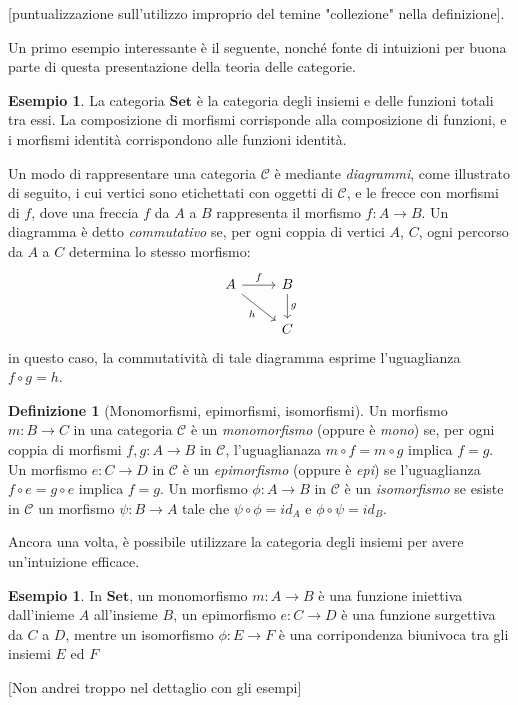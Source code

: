 \documentclass{article}
\theoremstyle{plain}
\theoremstyle{definition}
\newtheorem{definition}[theorem]{Definizione}
\newtheorem{example}[theorem]{Esempio}
\newcommand{\id}[1]{id_{#1}}
\begin{document}
	[puntualizzazione sull'utilizzo improprio del temine "collezione" nella definizione].
	
	Un primo esempio interessante è il seguente, nonché fonte di intuizioni per buona parte di questa presentazione della teoria delle categorie.

	\begin{example}
		La categoria $\textbf{Set}$ è la categoria degli insiemi e delle funzioni totali tra essi. 
		La composizione di morfismi corrisponde alla composizione di funzioni, e i morfismi identità corrispondono alle funzioni identità.
	\end{example}

	Un modo di rappresentare una categoria $\mathcal{C}$ è mediante \emph{diagrammi}, come illustrato di seguito,
	i cui vertici sono etichettati con oggetti di $\mathcal{C}$, e le frecce con morfismi di $f$, dove una 
	freccia $f$ da $A$ a $B$ rappresenta il morfismo $f: A \rightarrow B$. 
	Un diagramma è detto \emph{commutativo} se, per ogni coppia di vertici $A$, $C$, 
	ogni percorso da $A$ a $C$ determina lo stesso morfismo:
	\[
		\begin{tikzcd}
			A \arrow[r, "f"] \arrow[rd, "h" swap] & B  \arrow[d, "g"] \\
			& C 
		\end{tikzcd}
	\]
	in questo caso, la commutatività di tale diagramma esprime l'uguaglianza $f \circ g = h$.

	\begin{definition}[Monomorfismi, epimorfismi, isomorfismi]
		Un morfismo $m:B \rightarrow C$ in una categoria $\mathcal{C}$ è un \emph{monomorfismo}
		(oppure è \emph{mono}) se, per ogni coppia di morfismi $f, g: A \rightarrow B$ in $\mathcal{C}$, 
		l'uguaglianaza $m \circ f = m \circ g$ implica $f = g$. \-
		Un morfismo $e: C \rightarrow D$ in $\mathcal{C}$ è un \emph{epimorfismo} (oppure è \emph{epi}) se
		l'uguaglianza $f \circ e = g \circ e$ implica $f = g$. \-
		Un morfismo $\phi: A \rightarrow B$ in $\mathcal{C}$ è un \emph{isomorfismo} se esiste in $\mathcal{C}$
		un morfismo $\psi: B \rightarrow A$ tale che $\psi \circ \phi = \id{A}$ e $\phi \circ \psi = \id B$.

	\end{definition}

	Ancora una volta, è possibile utilizzare la categoria degli insiemi per avere un'intuizione efficace.

	\begin{example}
		In $\textbf{Set}$, un monomorfismo $m: A \rightarrow B$ è una funzione iniettiva dall'inieme $A$ all'insieme $B$,
		un epimorfismo $e: C \rightarrow D$ è una funzione surgettiva da $C$ a $D$, mentre un isomorfismo $\phi: E \rightarrow F$
		è una corripondenza biunivoca tra gli insiemi $E$ ed $F$
	\end{example}

	[Non andrei troppo nel dettaglio con gli esempi]
\end{document}
